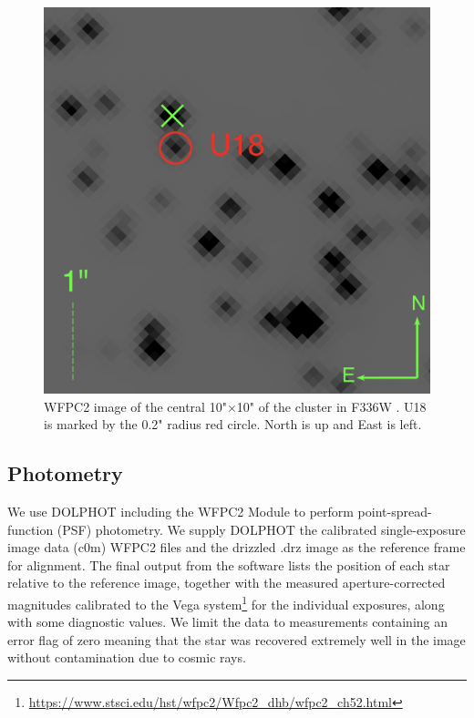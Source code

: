 \documentclass[fleqn,usenatbib,useAMS,letters]{mnras}
\begin{document}
 \begin{figure}
	\includegraphics[width= \columnwidth]{hstds9.png}
    \caption{WFPC2 image of the central 10"$\times$10" of the cluster in F336W . U18 is marked by the 0.2" radius red circle. North is up and East is left.}
    \label{fig:u18}
\end{figure}



 \subsection{Photometry}
 
 We use DOLPHOT \citep{2000PASP..112.1383D} including the WFPC2 Module to perform point-spread-function (PSF) photometry. We supply DOLPHOT the calibrated single-exposure image data (c0m) WFPC2 files and the drizzled .drz image as the reference frame for alignment. The final output from the software lists the position of each star relative to the reference image, together with the measured aperture-corrected magnitudes calibrated to the Vega system\footnote{\url{https://www.stsci.edu/hst/wfpc2/Wfpc2\_dhb/wfpc2\_ch52.html}} for the individual exposures, along with some diagnostic values. We limit the data to measurements containing an error flag of zero meaning that the star was recovered extremely well in the image without contamination due to cosmic rays.
\end{document}
